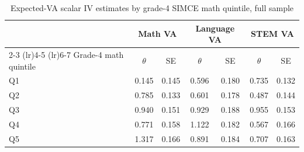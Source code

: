 \begin{table}[!htbp]
\centering
\caption{Expected-VA scalar IV estimates by grade-4 SIMCE math quintile, full sample}
\label{tab:scalar_school_value_iv_expected_va_by_simce4_math_quintile_all_sample}
\begin{tabular}{lcccccc}
\toprule
 & \multicolumn{2}{c}{Math VA} & \multicolumn{2}{c}{Language VA} & \multicolumn{2}{c}{STEM VA} \\
\cmidrule(lr){2-3} \cmidrule(lr){4-5} \cmidrule(lr){6-7}
Grade-4 math quintile & $\theta$ & SE & $\theta$ & SE & $\theta$ & SE \\
\midrule
Q1 & 0.145 & 0.145 & 0.596 & 0.180 & 0.735 & 0.132 \\
Q2 & 0.785 & 0.133 & 0.601 & 0.178 & 0.487 & 0.144 \\
Q3 & 0.940 & 0.151 & 0.929 & 0.188 & 0.955 & 0.153 \\
Q4 & 0.771 & 0.158 & 1.122 & 0.182 & 0.567 & 0.166 \\
Q5 & 1.317 & 0.166 & 0.891 & 0.184 & 0.707 & 0.163 \\
\bottomrule
\end{tabular}
\end{table}

